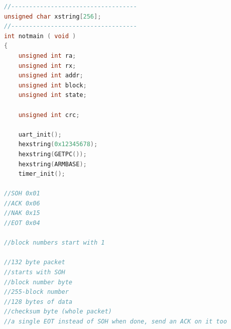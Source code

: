 \begin{lstlisting}[caption={bootloader05.c},label={lst:bootloader},language=C]
//-----------------------------------
unsigned char xstring[256];
//-----------------------------------
int notmain ( void )
{
    unsigned int ra;
    unsigned int rx;
    unsigned int addr;
    unsigned int block;
    unsigned int state;

    unsigned int crc;

    uart_init();
    hexstring(0x12345678);
    hexstring(GETPC());
    hexstring(ARMBASE);
    timer_init();

//SOH 0x01
//ACK 0x06
//NAK 0x15
//EOT 0x04

//block numbers start with 1

//132 byte packet
//starts with SOH
//block number byte
//255-block number
//128 bytes of data
//checksum byte (whole packet)
//a single EOT instead of SOH when done, send an ACK on it too


\end{lstlisting}

